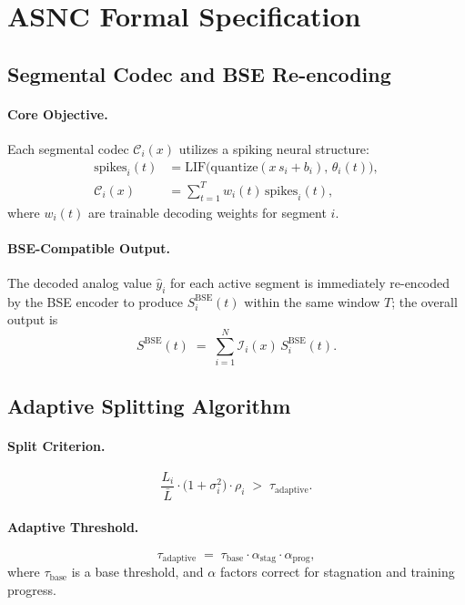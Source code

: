 \documentclass{article}
\theoremstyle{plain}
\theoremstyle{definition}
\theoremstyle{remark}
\begin{document}
\section{ASNC Formal Specification}
\label{app:asnc_details}

\subsection{Segmental Codec and BSE Re-encoding}
\paragraph{Core Objective.}
Each segmental codec $\mathcal{C}_i(x)$ utilizes a spiking neural structure:
\begin{align}
\text{spikes}_i(t) &= \mathrm{LIF}\!\big(\mathrm{quantize}(x\, s_i + b_i),\, \theta_i(t)\big), \\
\mathcal{C}_i(x) &= \sum_{t=1}^{T} w_i(t)\, \text{spikes}_i(t),
\end{align}
where $w_i(t)$ are trainable decoding weights for segment $i$.

\paragraph{BSE-Compatible Output.}
The decoded analog value $\widehat{y}_i$ for each active segment is immediately re-encoded by the BSE encoder to produce $S^{\mathrm{BSE}}_i(t)$ within the same window $T$; the overall output is
\begin{equation}
S^{\mathrm{BSE}}(t) \;=\; \sum_{i=1}^{N} \mathcal{I}_i(x)\, S^{\mathrm{BSE}}_i(t).
\end{equation}

\subsection{Adaptive Splitting Algorithm}
\paragraph{Split Criterion.}
\begin{equation}
\frac{L_i}{\bar{L}} \cdot \big(1 + \sigma_i^2\big) \cdot \rho_i \;>\; \tau_{\mathrm{adaptive}}.
\end{equation}

\paragraph{Adaptive Threshold.}
\begin{equation}
\tau_{\mathrm{adaptive}} \;=\; \tau_{\mathrm{base}} \cdot \alpha_{\mathrm{stag}} \cdot \alpha_{\mathrm{prog}},
\end{equation}
where $\tau_{\mathrm{base}}$ is a base threshold, and $\alpha$ factors correct for stagnation and training progress.
\end{document}

